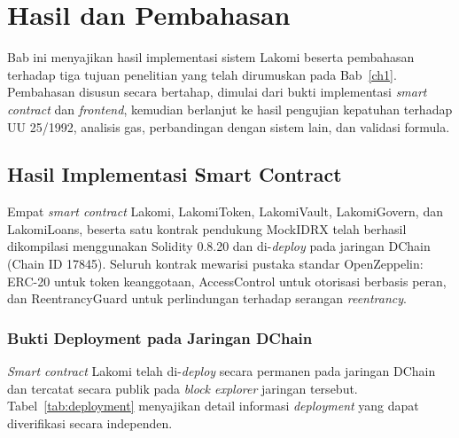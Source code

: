 \chapter{Hasil dan Pembahasan}
\label{ch4}

Bab ini menyajikan hasil implementasi sistem Lakomi beserta pembahasan terhadap tiga tujuan penelitian yang telah dirumuskan pada Bab~\ref{ch1}. Pembahasan disusun secara bertahap, dimulai dari bukti implementasi \textit{smart contract} dan \textit{frontend}, kemudian berlanjut ke hasil pengujian kepatuhan terhadap UU 25/1992, analisis gas, perbandingan dengan sistem lain, dan validasi formula.

\section{Hasil Implementasi Smart Contract}

Empat \textit{smart contract} Lakomi, LakomiToken, LakomiVault, LakomiGovern, dan LakomiLoans, beserta satu kontrak pendukung MockIDRX telah berhasil dikompilasi menggunakan Solidity 0.8.20 dan di-\textit{deploy} pada jaringan DChain (Chain ID 17845). Seluruh kontrak mewarisi pustaka standar OpenZeppelin: ERC-20 untuk token keanggotaan, AccessControl untuk otorisasi berbasis peran, dan ReentrancyGuard untuk perlindungan terhadap serangan \textit{reentrancy}.

\subsection{Bukti Deployment pada Jaringan DChain}

\textit{Smart contract} Lakomi telah di-\textit{deploy} secara permanen pada jaringan DChain dan tercatat secara publik pada \textit{block explorer} jaringan tersebut. Tabel~\ref{tab:deployment} menyajikan detail informasi \textit{deployment} yang dapat diverifikasi secara independen.

